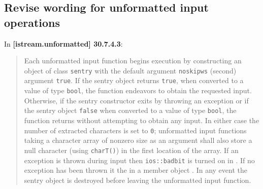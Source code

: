 \documentclass{wg21}
\begin{document}
\subsection{Revise wording for unformatted input operations}
In \textbf{[istream.unformatted] 30.7.4.3}:
\begin{quote}
Each unformatted input function begins execution by constructing  an object of
class \texttt{sentry} with the default argument \texttt{noskipws} (second)
argument \texttt{true}. If the sentry object returns \texttt{true}, when
converted to a value of type \texttt{bool}, the function endeavors to obtain
the requested input. Otherwise, if the sentry constructor exits by throwing an
exception or if the sentry object  \texttt{false}\removed{,} when converted to a
value of type \texttt{bool}, the function returns without attempting to obtain
any input. In either case the number of extracted characters is set to \texttt{0};
unformatted input functions taking a character array of nonzero size as an
argument shall also store a null character (using \texttt{charT()}) in the
first location of the array.  If an exception is
thrown during input then \texttt{ios::badbit} is turned on in .  If no exception has been thrown it
 the  in a member object .
 In any event the sentry object is destroyed before
leaving the unformatted input function.
\end{quote}
\end{document}
